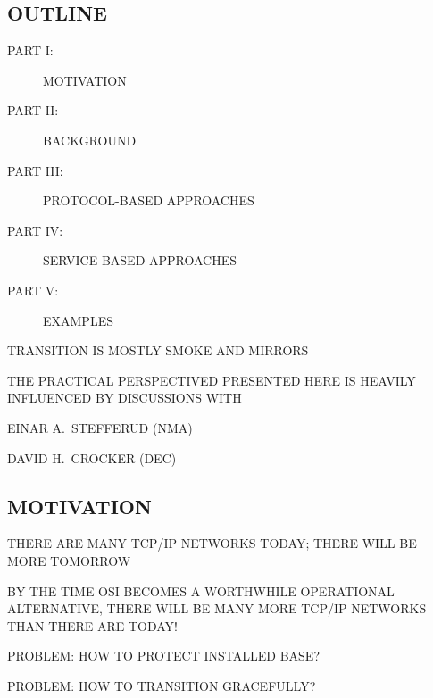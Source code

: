 


\begin{bwslide}
\part*	{OUTLINE}\bf

\begin{description}
\item[PART I:]		MOTIVATION

\item[PART II:]		BACKGROUND

\item[PART III:]	PROTOCOL-BASED APPROACHES

\item[PART IV:]		SERVICE-BASED APPROACHES

\item[PART V:]		EXAMPLES
\end{description}
\end{bwslide}


\begin{bwslide}

\begin{nrtc}
\item	TRANSITION IS MOSTLY SMOKE AND MIRRORS

\item	THE PRACTICAL PERSPECTIVED PRESENTED HERE IS HEAVILY INFLUENCED BY
	DISCUSSIONS WITH
    \begin{nrtc}
    \item	EINAR A.~STEFFERUD (NMA)

    \item	DAVID H.~CROCKER (DEC)
    \end{nrtc}
\end{nrtc}
\end{bwslide}


\begin{bwslide}
\part	{MOTIVATION}\bf

\begin{nrtc}
\item	THERE ARE MANY TCP/IP NETWORKS TODAY; THERE WILL BE MORE TOMORROW

\item	BY THE TIME OSI BECOMES A WORTHWHILE OPERATIONAL ALTERNATIVE,
	THERE WILL BE MANY MORE TCP/IP NETWORKS THAN THERE ARE TODAY!

\item	PROBLEM: HOW TO PROTECT INSTALLED BASE?

\item	PROBLEM: HOW TO TRANSITION GRACEFULLY?
\end{nrtc}
\end{bwslide}


